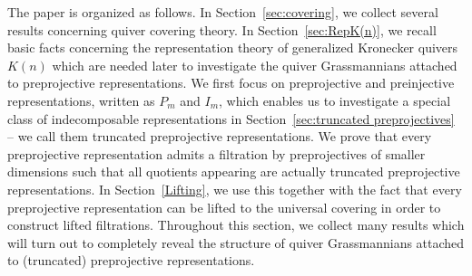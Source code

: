 \documentclass[smallextended,envcountsect,envcountsame]{svjour3}
\numberwithin{equation}{section}
\begin{document}
The paper is organized as follows.
In Section~\ref{sec:covering}, we collect several results concerning quiver covering theory.
In Section~\ref{sec:RepK(n)}, we recall basic facts concerning the representation theory of generalized Kronecker quivers $K(n)$ which are needed later to investigate the quiver Grassmannians attached to preprojective representations.
We first focus on preprojective and preinjective representations, written as $P_m$ and $I_m$, which enables us to investigate a special class of indecomposable representations in Section~\ref{sec:truncated preprojectives} -- we call them truncated preprojective representations.
We prove that every preprojective representation admits a filtration by preprojectives of smaller dimensions such that all quotients appearing are actually truncated preprojective representations.
In Section~\ref{Lifting}, we use this together with the fact that every preprojective representation can be lifted to the universal covering in order to construct lifted filtrations.
Throughout this section, we collect many results which will turn out to completely reveal the structure of quiver Grassmannians attached to (truncated) preprojective representations.
\end{document}
